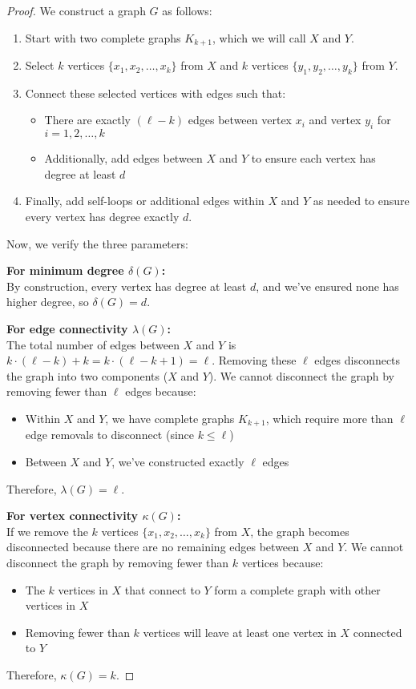 \documentclass{article}
\theoremstyle{definition}
\begin{document}
\begin{proof}
We construct a graph $G$ as follows:

\begin{enumerate}
\item Start with two complete graphs $K_{k+1}$, which we will call $X$ and $Y$.

\item Select $k$ vertices $\{x_1, x_2, \ldots, x_k\}$ from $X$ and $k$ vertices $\{y_1, y_2, \ldots, y_k\}$ from $Y$.

\item Connect these selected vertices with edges such that:
  \begin{itemize}
    \item There are exactly $(\ell-k)$ edges between vertex $x_i$ and vertex $y_i$ for $i = 1, 2, \ldots, k$
    \item Additionally, add edges between $X$ and $Y$ to ensure each vertex has degree at least $d$
  \end{itemize}

\item Finally, add self-loops or additional edges within $X$ and $Y$ as needed to ensure every vertex has degree exactly $d$.
\end{enumerate}

Now, we verify the three parameters:

\textbf{For minimum degree $\delta(G)$:}\\
By construction, every vertex has degree at least $d$, and we've ensured none has higher degree, so $\delta(G) = d$.

\textbf{For edge connectivity $\lambda(G)$:}\\
The total number of edges between $X$ and $Y$ is $k \cdot (\ell-k) + k = k \cdot (\ell-k+1) = \ell$. 
Removing these $\ell$ edges disconnects the graph into two components ($X$ and $Y$).
We cannot disconnect the graph by removing fewer than $\ell$ edges because:
\begin{itemize}
  \item Within $X$ and $Y$, we have complete graphs $K_{k+1}$, which require more than $\ell$ edge removals to disconnect (since $k \leq \ell$)
  \item Between $X$ and $Y$, we've constructed exactly $\ell$ edges
\end{itemize}
Therefore, $\lambda(G) = \ell$.

\textbf{For vertex connectivity $\kappa(G)$:}\\
If we remove the $k$ vertices $\{x_1, x_2, \ldots, x_k\}$ from $X$, the graph becomes disconnected because there are no remaining edges between $X$ and $Y$.
We cannot disconnect the graph by removing fewer than $k$ vertices because:
\begin{itemize}
  \item The $k$ vertices in $X$ that connect to $Y$ form a complete graph with other vertices in $X$
  \item Removing fewer than $k$ vertices will leave at least one vertex in $X$ connected to $Y$
\end{itemize}
Therefore, $\kappa(G) = k$.


\end{proof}
\end{document}
